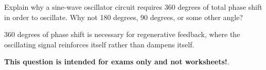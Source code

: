 

Explain why a sine-wave oscillator circuit requires 360 degrees of total phase shift in order to oscillate.  Why not 180 degrees, 90 degrees, or some other angle?







360 degrees of phase shift is necessary for regenerative feedback, where the oscillating signal reinforces itself rather than dampens itself.







{\bf This question is intended for exams only and not worksheets!}.




